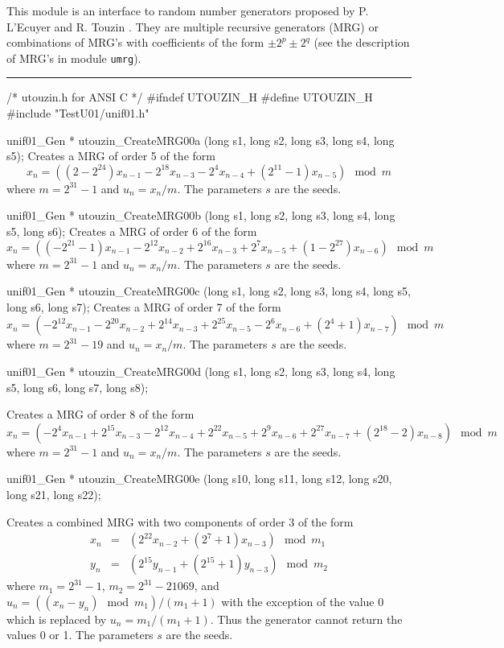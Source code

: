 
This module is an interface to random number generators proposed by
P. L'Ecuyer and R. Touzin \cite{rTOU01a}.
They are multiple recursive generators (MRG) or combinations of MRG's
with coefficients of the form $\pm2^p \pm 2^q$ 
(see the description of MRG's in module {\tt umrg}). 


\bigskip\hrule
\code\hide
/*  utouzin.h  for ANSI C */
#ifndef UTOUZIN_H
#define UTOUZIN_H
\endhide
#include "TestU01/unif01.h"


unif01_Gen * utouzin_CreateMRG00a (long s1, long s2, long s3, long s4,
                                   long s5);
\endcode
  \tab Creates a MRG of order 5 of the form
$$
x_n = \left((2 -2^{24})x_{n-1} - 2^{18}x_{n-3} - 2^{4}x_{n-4}
  + (2^{11} - 1)x_{n-5}\right) \mod m
$$
where $ m = 2^{31} - 1$ and $u_n = x_n/m$. The parameters $s$ are the seeds.
 \endtab
\code


unif01_Gen * utouzin_CreateMRG00b (long s1, long s2, long s3, long s4,
                                   long s5, long s6);
\endcode
  \tab Creates a MRG of order 6 of the form
$$
x_n = \left((-2^{21} - 1)x_{n-1} - 2^{12}x_{n-2} + 2^{16}x_{n-3}
  + 2^{7}x_{n-5} + (1 - 2^{27})x_{n-6}\right) \mod m
$$
where $ m = 2^{31} - 1$ and $u_n = x_n/m$. The parameters $s$ are the seeds.
 \endtab
\code


unif01_Gen * utouzin_CreateMRG00c (long s1, long s2, long s3, long s4,
                                   long s5, long s6, long s7);
\endcode
  \tab Creates a MRG of order 7 of the form
$$
x_n = \left(-2^{12}x_{n-1} - 2^{20}x_{n-2} + 2^{14}x_{n-3}
  + 2^{25}x_{n-5} - 2^{6}x_{n-6} + (2^4 + 1)x_{n-7}\right) \mod m
$$
where $ m = 2^{31} - 19$ and $u_n = x_n/m$. The parameters $s$ are the seeds.
 \endtab
\code


unif01_Gen * utouzin_CreateMRG00d (long s1, long s2, long s3, long s4,
                                   long s5, long s6, long s7, long s8);

\endcode
  \tab Creates a MRG of order 8 of the form
$$
x_n = \left(-2^{4}x_{n-1} + 2^{15}x_{n-3} - 2^{12}x_{n-4} + 2^{22}x_{n-5} +
   2^{9}x_{n-6} + 2^{27}x_{n-7} + (2^{18} - 2)x_{n-8}\right) \mod m
$$
where $ m = 2^{31} - 1$ and $u_n = x_n/m$. The parameters $s$ are the seeds.
 \endtab
\code


unif01_Gen * utouzin_CreateMRG00e (long s10, long s11, long s12, 
                                   long s20, long s21, long s22);

\endcode
  \tab Creates a combined MRG with two components of order 3 of the form
\begin{eqnarray*}
x_n &=& \left(2^{22}x_{n-2}  + (2^{7} + 1)x_{n-3}\right) \mod m_1 \\
y_n &=& \left(2^{15}y_{n-1}  + (2^{15} + 1)y_{n-3}\right) \mod m_2
\end{eqnarray*}
where $m_1 = 2^{31} - 1$, $m_2 = 2^{31} - 21069$,  and $u_n = 
 \left((x_n - y_n)\mod m_1 \right)/(m_1+1)$ with the exception of the value
0 which is replaced by $u_n = m_1 /(m_1+1)$.  Thus the generator cannot return
the values 0 or 1.
 The parameters $s$ are the seeds.
 \endtab
\code


